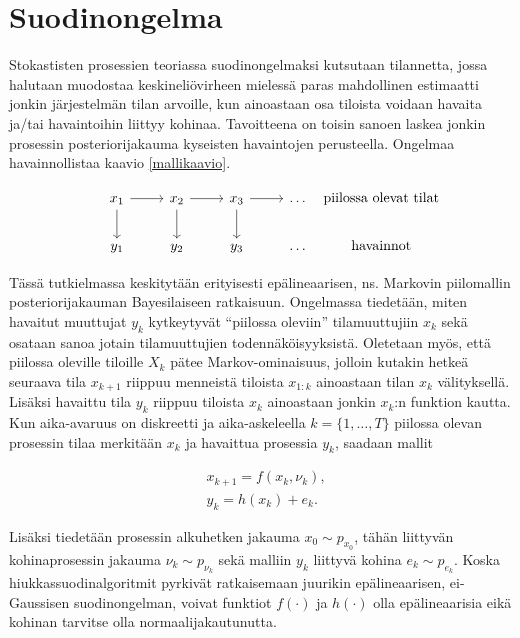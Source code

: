 \documentclass[
  12pt,
  a4paper, twoside]{book}
\begin{document}
\section{Suodinongelma}

Stokastisten prosessien teoriassa suodinongelmaksi kutsutaan tilannetta, jossa halutaan muodostaa keskineliövirheen mielessä paras mahdollinen estimaatti jonkin järjestelmän tilan arvoille, kun ainoastaan osa tiloista voidaan havaita ja/tai havaintoihin liittyy kohinaa. Tavoitteena on toisin sanoen laskea jonkin prosessin posteriorijakauma kyseisten havaintojen perusteella. Ongelmaa havainnollistaa kaavio \ref{mallikaavio}.

\begin{equation}\label{mallikaavio}
\begin{tikzcd}
x_1 \arrow[d] \arrow[r] & x_2 \arrow[d] \arrow[r] & x_3 \arrow[d] \arrow[r] & \ldots & \makebox[\widthof{$ \text{havainnot}$}]{$\text{piilossa olevat tilat}$} \\
y_1  & y_2  & y_3  & \ldots & \makebox[\widthof{$ \text{havainnot}$}]{$\text{havainnot}$}
\end{tikzcd}
\end{equation}

Tässä tutkielmassa keskitytään erityisesti epälineaarisen, ns. Markovin piilomallin posteriorijakauman Bayesilaiseen ratkaisuun. Ongelmassa tiedetään, miten havaitut muuttujat \(y_k\) kytkeytyvät ``piilossa oleviin'' tilamuuttujiin \(x_k\) sekä osataan sanoa jotain tilamuuttujien todennäköisyyksistä. Oletetaan myös, että piilossa oleville tiloille \(X_k\) pätee Markov-ominaisuus, jolloin kutakin hetkeä seuraava tila \(x_{k+1}\) riippuu menneistä tiloista \(x_{1:k}\) ainoastaan tilan \(x_k\) välityksellä. Lisäksi havaittu tila \(y_k\) riippuu tiloista \(x_{k}\) ainoastaan jonkin \(x_k\):n funktion kautta. Kun aika-avaruus on diskreetti ja aika-askeleella \(k=\{1,\ldots,T\}\) piilossa olevan prosessin tilaa merkitään \(x_k\) ja havaittua prosessia \(y_k\), saadaan mallit

\begin{align}
&\label{malli-1} x_{k+1} = f(x_k, \nu_k),\\
&\label{malli-2} y_{k} = h(x_k)+e_k.
\end{align}

Lisäksi tiedetään prosessin alkuhetken jakauma \(x_0 \sim p_{x_{0}}\), tähän liittyvän kohinaprosessin jakauma \(\nu_k \sim p_{\nu_{k}}\) sekä malliin \(y_k\) liittyvä kohina \(e_k \sim p_{e_k}\). Koska hiukkassuodinalgoritmit pyrkivät ratkaisemaan juurikin epälineaarisen, ei-Gaussisen suodinongelman, voivat funktiot \(f(\cdot)\) ja \(h(\cdot)\) olla epälineaarisia eikä kohinan tarvitse olla normaalijakautunutta.
\end{document}
